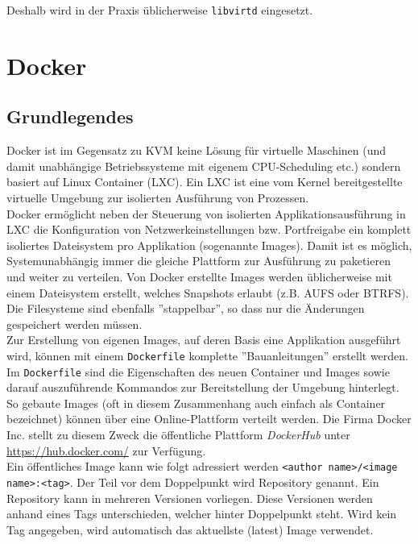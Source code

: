 Deshalb wird in der Praxis üblicherweise  \lstinline|libvirtd| eingesetzt.

\section{Docker}
\subsection{Grundlegendes}
Docker ist im Gegensatz zu KVM keine Lösung für virtuelle Maschinen (und damit unabhängige Betriebssysteme mit eigenem CPU-Scheduling etc.) sondern basiert auf Linux Container (LXC). Ein LXC ist eine vom Kernel bereitgestellte virtuelle Umgebung zur isolierten Ausführung von Prozessen. \\

Docker ermöglicht neben der Steuerung von isolierten Applikationsausführung in LXC die Konfiguration von Netzwerkeinstellungen bzw. Portfreigabe ein komplett isoliertes Dateisystem pro Applikation (sogenannte Images). Damit ist es möglich, Systemunabhängig immer die gleiche Plattform zur Ausführung zu paketieren und weiter zu verteilen. Von Docker erstellte Images werden üblicherweise mit einem Dateisystem erstellt, welches Snapshots erlaubt (z.B. AUFS oder BTRFS). Die Filesysteme sind ebenfalls ''stappelbar'', so dass nur die Änderungen gespeichert werden müssen. \\

Zur Erstellung von eigenen Images, auf deren Basis eine Applikation ausgeführt wird, können mit einem \lstinline[]|Dockerfile| komplette ''Bauanleitungen'' erstellt werden. Im \lstinline[]|Dockerfile| sind die Eigenschaften des neuen Container und Images sowie darauf auszuführende Kommandos zur Bereitstellung der Umgebung hinterlegt. \\

So gebaute Images (oft in diesem Zusammenhang auch einfach als Container bezeichnet) können über eine Online-Plattform verteilt werden. Die Firma Docker Inc. stellt zu diesem Zweck die öffentliche Plattform \emph{DockerHub} unter \url{https://hub.docker.com/} zur Verfügung. \\

Ein öffentliches Image kann wie folgt adressiert werden \lstinline[]|<author name>/<image name>:<tag>|. Der Teil vor dem Doppelpunkt wird Repository genannt. Ein Repository kann in mehreren Versionen vorliegen. Diese Versionen werden anhand eines Tags unterschieden, welcher hinter Doppelpunkt steht. Wird kein Tag angegeben, wird automatisch das aktuellste (latest) Image verwendet. \\

